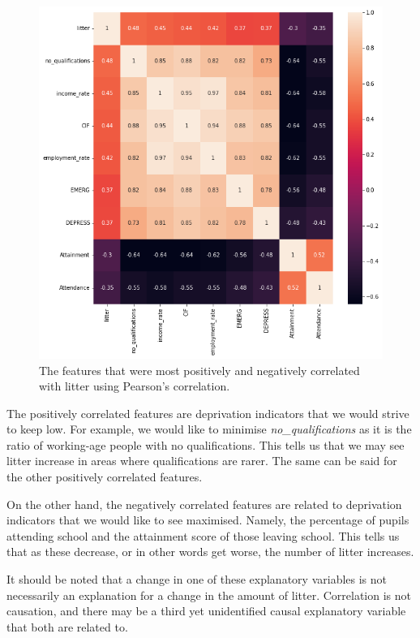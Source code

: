 \documentclass{thesis}
\begin{document}
\begin{figure}[h!]
    \centering
    \includegraphics[scale=0.45]{images/corr-matrix.png}
    \caption{The features that were most positively and negatively correlated with litter using Pearson's correlation.}
    \label{fig:correlation-matrix}
\end{figure}

The positively correlated features are deprivation indicators that we would strive to keep low. For example, we would like to minimise \textit{no\_qualifications} as it is the ratio of working-age people with no qualifications. This tells us that we may see litter increase in areas where qualifications are rarer. The same can be said for the other positively correlated features.

On the other hand, the negatively correlated features are related to deprivation indicators that we would like to see maximised. Namely, the percentage of pupils attending school and the attainment score of those leaving school. This tells us that as these decrease, or in other words get worse, the number of litter increases.

It should be noted that a change in one of these explanatory variables is not necessarily an explanation for a change in the amount of litter. Correlation is not causation, and there may be a third yet unidentified causal explanatory variable that both are related to.
\end{document}
